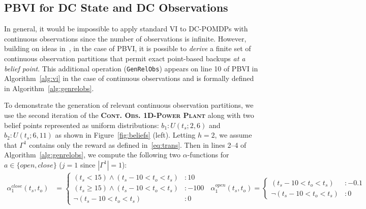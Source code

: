 \documentclass{article} %
\newcommand{\open}{\mathit{open}}
\newcommand{\close}{\mathit{close}}
\begin{document}
\subsection{PBVI for DC State and DC Observations} 
\label{sec:cont_obs}

In general, it would be impossible to apply standard VI to 
DC-POMDPs with continuous observations since the number of observations
is infinite.  However, building on ideas in~\cite{pascal_ijcai05},
in the case of PBVI, it is possible to \emph{derive} a finite set of
continuous observation partitions that permit exact point-based backups
\emph{at a belief point}.
This additional operation (\texttt{GenRelObs}) appears on line 10 of PBVI in 
Algorithm~\ref{alg:vi} in the case of continuous observations and is
formally defined in Algorithm~\ref{alg:genrelobs}.

To demonstrate the generation of relevant continuous observation partitions, 
we use the second iteration of the \textsc{\bf Cont. Obs. 1D-Power
  Plant} along with two belief points represented as 
uniform distributions: $b_1: U(t_s;2,6)$ and $b_2: U(t_s;6,11)$ as
shown in Figure~\ref{fig:beliefs} (left).
Letting $h=2$, we assume that $\Gamma^{1}$ contains only the 
reward as defined in~\eqref{eq:trans}.
Then in lines 2--4 of Algorithm~\ref{alg:genrelobs}, we compute the 
following two $\alpha$-functions for $a \in \{ \open, \close \}$ 
($j=1$ since $|\Gamma^{1}| = 1$):
{\footnotesize
\vspace{-1mm}
\begin{align}
\alpha_1^{\close}(t_s,t_o) &= 
\begin{cases}
 (t_s<15)\wedge (t_s \! - \! 10 < t_o<t_s) &\!\!\!: 10 \\
(t_s\geq15)\wedge (t_s \! - \! 10 < t_o<t_s) &\!\!\!: -100  \\
\neg(t_s \! - \! 10 < t_o<t_s) &\!\!\! : 0
\end{cases}
\;\;
\alpha_1^{\open}(t_s,t_o) = \begin{cases}
(t_s \! - \! 10 < t_o<t_s) &\!\!\!: -0.1 \\
\neg(t_s \! - \! 10 < t_o<t_s) &\!\!\!: 0
\end{cases}
\nonumber
\end{align}
\vspace{-4mm}
} 
\end{document}
